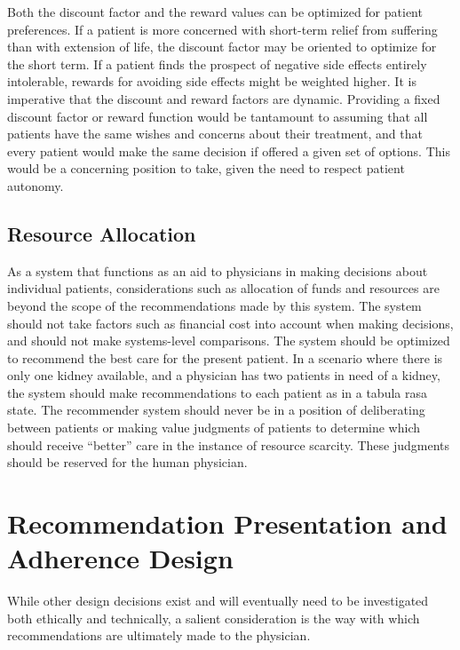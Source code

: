 \documentclass[]{spie}  %
\begin{document}
Both the discount factor and the reward values can be optimized for patient preferences. If a patient is more concerned with short-term relief from suffering than with extension of life, the discount factor may be oriented to optimize for the short term. If a patient finds the prospect of negative side effects entirely intolerable, rewards for avoiding side effects might be weighted higher. It is imperative that the discount and reward factors are dynamic. Providing a fixed discount factor or reward function would be tantamount to assuming that all patients have the same wishes and concerns about their treatment, and that every patient would make the same decision if offered a given set of options. This would be a concerning position to take, given the need to respect patient autonomy.

\subsection{Resource Allocation}

As a system that functions as an aid to physicians in making decisions about individual patients, considerations such as allocation of funds and resources are beyond the scope of the recommendations made by this system. The system should not take factors such as financial cost into account when making decisions, and should not make systems-level comparisons. The system should be optimized to recommend the best care for the present patient. In a scenario where there is only one kidney available, and a physician has two patients in need of a kidney, the system should make recommendations to each patient as in a tabula rasa state. The recommender system should never be in a position of deliberating between patients or making value judgments of patients to determine which should receive “better” care in the instance of resource scarcity. These judgments should be reserved for the human physician.

\section{Recommendation Presentation and Adherence Design}

While other design decisions exist and will eventually need to be investigated both ethically and technically, a salient consideration is the way with which recommendations are ultimately made to the physician.
\end{document}
